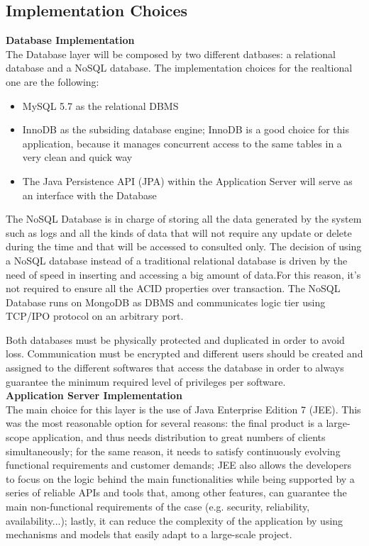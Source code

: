 \subsection{Implementation Choices}
\textbf{Database Implementation}\\

The Database layer will be composed by two different datbases: a relational database and a NoSQL database. The implementation choices for the realtional one are the following:
\begin{itemize}
\item MySQL 5.7 as the relational DBMS
\item InnoDB as the subsiding database engine; InnoDB is a good choice for this application, because it manages concurrent access to the same tables in a very clean and quick way
\item The Java Persistence API (JPA) within the Application Server will serve as an interface with the Database
\end{itemize}

The NoSQL Database is in charge of storing all the data generated by the system such as logs and all the kinds of data that  will not require any update or delete during the time and that will be accessed to consulted only. The decision of using a NoSQL database instead of a traditional relational database is driven by the need of speed in inserting and accessing a big amount of data.For this reason, it's not required to ensure all the ACID properties over transaction. The NoSQL Database runs on MongoDB as DBMS and communicates logic tier using TCP/IPO protocol on an arbitrary port.

Both databases must be physically protected and duplicated in order to avoid loss. Communication must be encrypted and different users should be created and assigned to the different softwares that access the database in order to always guarantee the minimum required level of privileges per software.\\

\hspace{-\parindent}\textbf{Application Server Implementation}\\

The main choice for this layer is the use of Java Enterprise Edition 7 (JEE). This was the most reasonable option for several reasons: the final product is a large-scope application, and thus needs distribution to great numbers of clients simultaneously; for the same reason, it needs to satisfy continuously evolving functional requirements and customer demands; JEE also allows the developers to focus on the logic behind the main functionalities while being supported by a series of reliable APIs and tools that, among other features, can guarantee the main non-functional requirements of the case (e.g. security, reliability, availability...); lastly, it can reduce the complexity of the application by using mechanisms and models that easily adapt to a large-scale project. 

